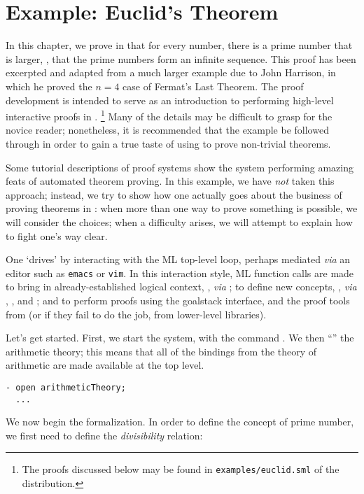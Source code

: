 \chapter{Example: Euclid's Theorem}
\label{chap:euclid}

\setcounter{sessioncount}{0}

In this chapter, we prove in \holn{} that for every number, there is a prime number that is larger, \ie, that the prime numbers form an infinite sequence.
This proof has been excerpted and adapted from a much larger example due to John Harrison, in which he proved the $n = 4$ case of Fermat's Last Theorem.
The proof development is intended to serve as an introduction to performing high-level interactive proofs in \holn.%
\footnote{The proofs discussed below may be found in
\texttt{examples/euclid.sml} of the \HOL{} distribution.}
Many of the details may be difficult to grasp for the novice reader; nonetheless, it is recommended that the example be followed through in order to gain a true taste of using \HOL{} to prove non-trivial theorems.

Some tutorial descriptions of proof systems show the system performing amazing feats of automated theorem proving.
In this example, we have \textit{not} taken this approach; instead, we try to show how one actually goes about the business of proving theorems in \holn{}: when more than one way to prove something is possible, we will consider the choices; when a difficulty arises, we will attempt to explain how to fight one's way clear.

One `drives' \holn{} by interacting with the ML top-level loop, perhaps mediated \emph{via} an editor such as \texttt{emacs} or \texttt{vim}.
In this interaction style, ML function calls are made to bring in already-established logical context, \eg, \emph{via} ;
to define new concepts, \eg, \emph{via} ,  , and ;
and to perform proofs using the goalstack interface, and the proof tools from  (or if they fail to do the job, from lower-level libraries).

Let's get started.
First, we start the system, with the command .
We then ``'' the arithmetic theory; this means that all of the \ML{} bindings from the \HOL{} theory of arithmetic are made available at the top level.
\begin{session}
\begin{verbatim}
- open arithmeticTheory;
  ...
\end{verbatim}
\end{session}
We now begin the formalization. In order to define the concept of
prime number, we first need to define the \emph{divisibility} relation:

